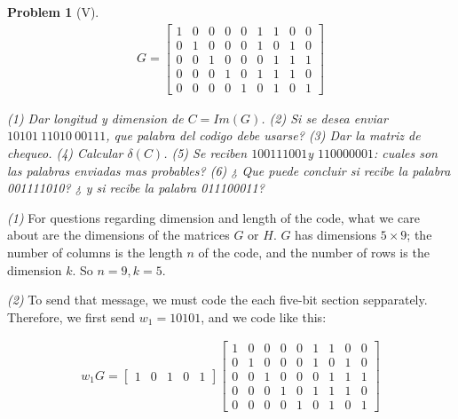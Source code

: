 \documentclass[a4paper]{article}
\newtheorem{problem}{Problem}
\newtheorem{problem}{Problem}
\begin{document}
\begin{problem}[V]

    \begin{align*}
    G = \begin{bmatrix} 
        1  &0 & 0  &0&  0&  1&  1&  0&  0  \\
        0  &1 & 0  &0&  0&  1&  0&  1&  0 \\ 
        0  &0 & 1  &0&  0&  0&  1&  1&  1 \\ 
        0  &0 & 0  &1&  0&  1&  1&  1&  0 \\ 
        0  &0 & 0  &0&  1&  0&  1&  0&  1
    \end{bmatrix} 
\end{align*}
   
\textit{(1)} Dar longitud y dimension de $C = Im(G)$. \textit{(2)} Si se desea enviar 
$10101 ~ 11010 ~ 00111$, que palabra del codigo debe usarse? \textit{(3)} Dar 
la matriz de chequeo. (4) Calcular $\delta(C)$. \textit{(5)} Se reciben 
$100111001 $y $110000001$: cuales son las palabras enviadas mas probables?
\textit{(6)} ¿ Que puede concluir si recibe la palabra 001111010? ¿ y si recibe la palabra 011100011?
\end{problem} 

\textit{(1)} For questions regarding dimension and length of the code, what we
care about are the dimensions of the matrices $G$ or $H$. $G$ has dimensions $5
\times 9$; the number of columns is the length $n$ of the code, and the number
of rows is the dimension $k$. So $n = 9, k = 5$.

\textit{(2)} To send that message, we must code the each five-bit section 
sepparately. Therefore,
we first send $w_1 = 10101$, and we code like this:

\begin{align*}
    w_1G = \begin{bmatrix} 
        1&0&1&0&1  
    \end{bmatrix} 
    \begin{bmatrix} 
        1  &0 & 0  &0&  0&  1&  1&  0&  0  \\
        0  &1 & 0  &0&  0&  1&  0&  1&  0 \\ 
        0  &0 & 1  &0&  0&  0&  1&  1&  1 \\ 
        0  &0 & 0  &1&  0&  1&  1&  1&  0 \\ 
        0  &0 & 0  &0&  1&  0&  1&  0&  1
    \end{bmatrix} 
\end{align*}
\end{document}
